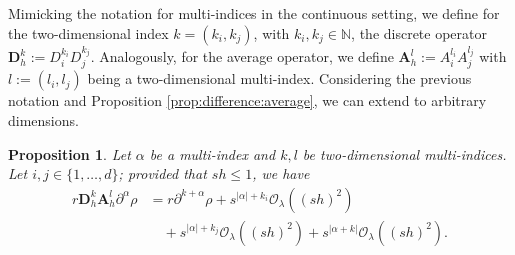 \documentclass[11pt,oneside,leqno]{amsart}
\numberwithin{equation}{section}
\numberwithin{equation}{section}
\newtheorem{proposition}[theorem]{Proposition}
\begin{document}
 Mimicking the notation for multi-indices in the continuous setting, we define for the two-dimensional index $k=(k_{i},k_{j})$, with $k_{i},k_{j}\in\mathbb{N}$, the discrete operator $\mathbf{D}_{h}^{k}:=D_{i}^{k_{i}}D_{j}^{k_{j}}$. Analogously, for the average operator, we define $\mathbf{A}_{h}^{l}:=A_{i}^{l_{i}}A_{j}^{l_{j}}$ with $l:=(l_{i},l_{j})$ being a two-dimensional multi-index. Considering the previous notation and Proposition \ref{prop:difference:average}, we can extend \cite[Proposition 4.5]{LOP-2020} to arbitrary dimensions.
\begin{proposition}\label{prop:weight}
    Let $\alpha$ be a multi-index and $k,l$ be two-dimensional multi-indices. Let $i,j\in\{1,\ldots,d\} $; provided that $sh\leq 1$, we have
    \begin{equation}\label{eq:average:difference:weight}
\begin{aligned}
r\mathbf{D}_{h}^{k}\mathbf{A}_{h}^{l}\partial^{\alpha}\rho &= r\partial^{k+\alpha}\rho + s^{|\alpha|+k_{i}}\mathcal{O}_{\lambda}((sh)^{2}) \\
&\quad + s^{|\alpha|+k_{j}}\mathcal{O}_{\lambda}((sh)^{2}) + s^{|\alpha+k|}\mathcal{O}_{\lambda}((sh)^{2}).
\end{aligned}
\end{equation}
\end{proposition}
\end{document}
